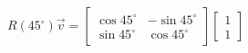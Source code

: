 \documentclass[preview]{standalone}
\begin{document}
\begin{align*}
R(45^\circ)\vec{v}=\begin{bmatrix}\cos45^\circ&-\sin45^\circ\\\sin45^\circ&\cos45^\circ\end{bmatrix}\begin{bmatrix}1\\1\end{bmatrix}
\end{align*}
\end{document}

